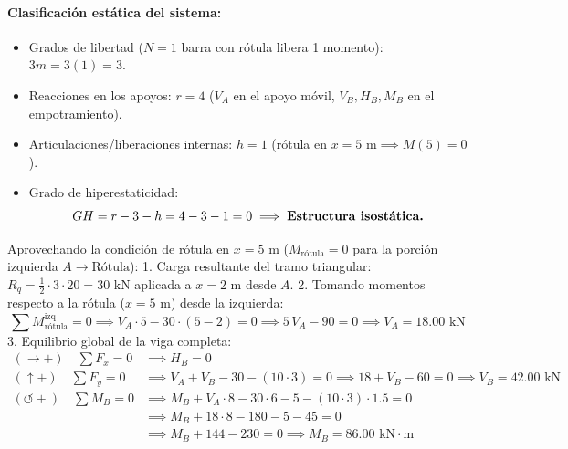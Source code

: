 \paragraph{Clasificación estática del sistema:}
\begin{itemize}
    \item Grados de libertad ($N=1$ barra con rótula libera 1 momento): $3m = 3(1) = 3$.
    \item Reacciones en los apoyos: $r = 4$ ($V_A$ en el apoyo móvil, $V_B, H_B, M_B$ en el empotramiento).
    \item Articulaciones/liberaciones internas: $h = 1$ (rótula en $x=5\text{ m} \implies M(5) = 0$).
    \item Grado de hiperestaticidad:
          \[
              GH = r - 3 - h = 4 - 3 - 1 = 0 \implies \text{\textbf{Estructura isostática.}}
          \]
\end{itemize}

Aprovechando la condición de rótula en $x = 5\text{ m}$ ($M_{\text{rótula}} = 0$ para la porción izquierda $A \to \text{Rótula}$):
1. Carga resultante del tramo triangular: $R_q = \frac{1}{2} \cdot 3 \cdot 20 = 30\text{ kN}$ aplicada a $x = 2\text{ m}$ desde $A$.
2. Tomando momentos respecto a la rótula ($x=5\text{ m}$) desde la izquierda:
\[
    \sum M_{\text{rótula}}^{\text{izq}} = 0 \implies V_A \cdot 5 - 30 \cdot (5 - 2) = 0 \implies 5\,V_A - 90 = 0 \implies \boxed{V_A = 18.00\text{ kN}}
\]
3. Equilibrio global de la viga completa:
\begin{align}
    (\rightarrow +) \quad \sum F_x = 0      & \implies \boxed{H_B = 0}                                                                                     \\
    (\uparrow +) \quad \sum F_y = 0         & \implies V_A + V_B - 30 - (10 \cdot 3) = 0 \implies 18 + V_B - 60 = 0 \implies \boxed{V_B = 42.00\text{ kN}} \\
    (\circlearrowleft +) \quad \sum M_B = 0 & \implies M_B + V_A \cdot 8 - 30 \cdot 6 - 5 - (10 \cdot 3) \cdot 1.5 = 0                                     \\
                                            & \implies M_B + 18 \cdot 8 - 180 - 5 - 45 = 0                                                                 \\
                                            & \implies M_B + 144 - 230 = 0 \implies \boxed{M_B = 86.00\text{ kN}\cdot\text{m}}
\end{align}

